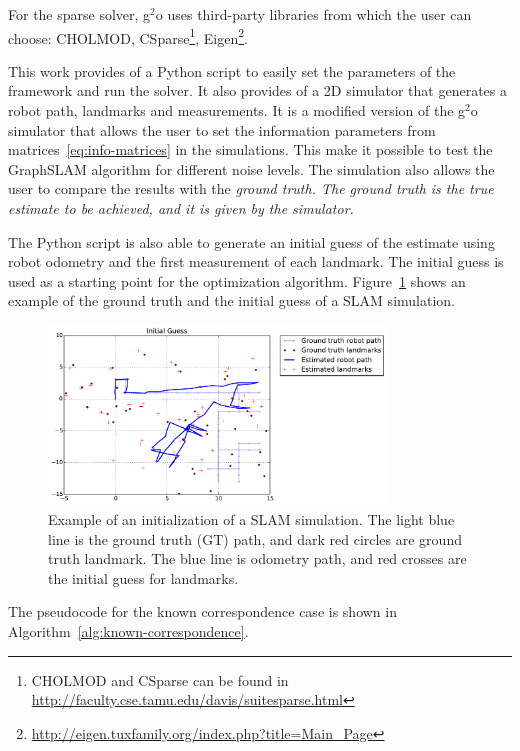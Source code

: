For the sparse solver, g$^2$o uses third-party libraries from which the user can choose: CHOLMOD, CSparse\footnote{CHOLMOD and CSparse can be found in \url{http://faculty.cse.tamu.edu/davis/suitesparse.html}}, Eigen\footnote{\url{http://eigen.tuxfamily.org/index.php?title=Main_Page}}. 

This work provides of a Python script to easily set the parameters of the framework and run the solver. It also provides of a 2D simulator that generates a robot path, landmarks and measurements. It is a modified version of the g$^2$o simulator that allows the user to set the information parameters from matrices~\eqref{eq:info-matrices} in the simulations. This make it possible to test the GraphSLAM algorithm for different noise levels. The simulation also allows the user to compare the results with the \it{ground truth}. The ground truth is the true estimate to be achieved, and it is given by the simulator. 

The Python script is also able to generate an initial guess of the estimate using robot odometry and the first measurement of each landmark. The initial guess is used as a starting point for the optimization algorithm. Figure~\ref{fig:simulation} shows an example of the ground truth and the initial guess of a SLAM simulation.

\begin{figure}[htbp!]
    \centering
    \includegraphics[width=0.8\textwidth]{imagenes/guess_it_20_nl_100_op_100_oa_100_lp_100_ds_100_kw_0.1.pdf}
    \caption[Example of an initialization of a SLAM simulation.]{Example of an initialization of a SLAM simulation. The light blue line is the ground truth (GT) path, and dark red circles are ground truth landmark. The blue line is odometry path, and red crosses are the initial guess for landmarks.}
    \label{fig:simulation}
\end{figure}

The pseudocode for the known correspondence case is shown in Algorithm~\ref{alg:known-correspondence}.

